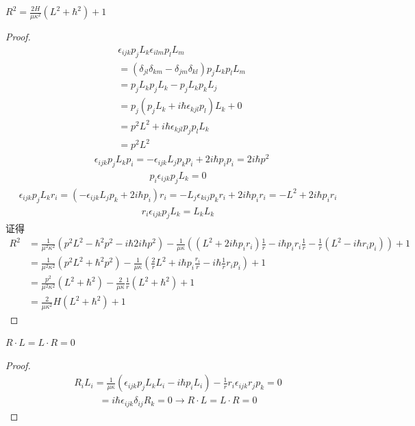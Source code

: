 \begin{theorem}
$R^2 = \frac{2H}{\mu\kappa^2}(L^2 + \hbar^2) + 1$
\end{theorem}
\begin{proof}
\begin{align*}
    &\epsilon_{ijk}p_j L_k \epsilon_{ilm} p_l L_m\\
    &= (\delta_{jl}\delta_{km} - \delta_{jm}\delta_{kl})p_j L_k p_l L_m \\
    &= p_j L_k p_j L_k - p_j L_k p_k L_j \\
    &= p_j (p_j L_k + i\hbar \epsilon_{kjl}p_l)L_k + 0\\
    &= p^2 L^2 + i\hbar \epsilon_{kjl}p_j p_l L_k \\
    &=p^2L^2
\end{align*}
\begin{align*}
    &\epsilon_{ijk}p_j L_k p_i= -\epsilon_{ijk}L_j p_k p_i + 2i\hbar p_i p_i= 2i\hbar p^2
\end{align*}
\begin{align*}
    p_i \epsilon_{ijk}p_jL_k = 0
\end{align*}
\begin{align*}
    \epsilon_{ijk}p_j L_k r_i = (-\epsilon_{ijk} L_j p_k + 2i\hbar p_i)r_i = -L_j \epsilon_{kij} p_k r_i + 2i\hbar p_i r_i = - L^2 + 2i\hbar p_i r_i
\end{align*}
\begin{align*}
    r_i\epsilon_{ijk}p_j L_k = L_k L_k
\end{align*}
证得
\begin{align*}
    R^2 &= \frac{1}{\mu^2\kappa^2} (p^2 L^2 - \hbar^2 p^2 - i\hbar 2i\hbar p^2) - \frac{1}{\mu\kappa}\left((L^2+2i\hbar p_i r_i)\frac{1}{r} - i\hbar p_i r_i \frac{1}{r} -\frac{1}{r}(L^2 - i\hbar r_i p_i)\right) +1\\
    &= \frac{1}{\mu^2\kappa^2} (p^2 L^2 + \hbar^2 p^2) - \frac{1}{\mu\kappa} \left(\frac{2}{r}L^2 + i\hbar p_i \frac{r_i}{r} - i\hbar \frac{1}{r}r_i p_i\right) + 1\\
    &= \frac{p^2}{\mu^2\kappa^2}(L^2 + \hbar^2) - \frac{2}{\mu\kappa}\frac{1}{r}(L^2+\hbar^2) + 1\\
    &=\frac{2}{\mu\kappa^2}H (L^2+\hbar^2) +1
\end{align*}
\end{proof}
\begin{theorem}
    $R\cdot L = L\cdot R = 0$
\end{theorem}
\begin{proof}
    \begin{align*}
        R_i L_i = \frac{1}{\mu\kappa} (\epsilon_{ijk}p_jL_k L_i - i\hbar p_i L_i) - \frac{1}{r}r_i \epsilon_{ijk}r_j p_k = 0
    \end{align*}
    \begin{align*}
        [L_i, R_i] = i\hbar \epsilon_{ijk} \delta_{ij} R_k = 0 \rightarrow R\cdot L = L\cdot R = 0
    \end{align*}
\end{proof}
